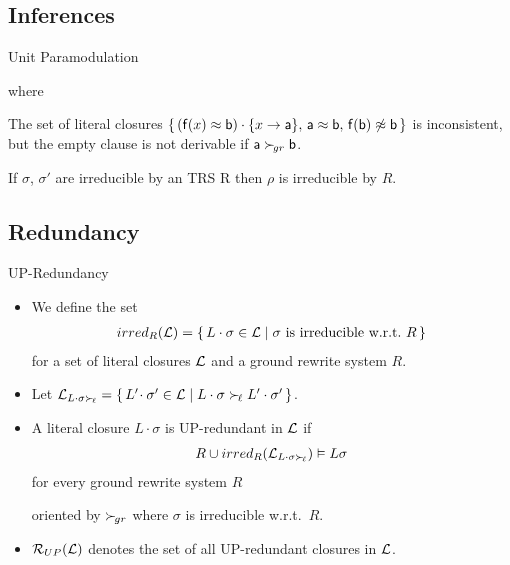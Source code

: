 \documentclass[%
handout,
]{beamer}
\begin{document}
\subsection{Inferences}
\begin{frame}{Unit Paramodulation}


    
    where
    

    \vspace{0.7em}

        \begin{example}
    The set of literal closures
    $\{\,
    (\mathsf{f}(x)\approx\mathsf{b})\cdot\{x\to\mathsf{a}\},\,
    \mathsf{a}\approx \mathsf{b},\,
    \mathsf{f}(\mathsf{b})\not\approx\mathsf{b}\,
    \}$ is inconsistent,
    but the empty clause is not derivable
    if $\mathsf{a}\mathrel\succ_{\!gr}\mathsf{b}$.
        \end{example}

        \vspace{0.7em}

    \begin{lemma}
        If $\sigma$, $\sigma'$ are irreducible by an TRS R then $\rho$ is irreducible by $R$.
    \end{lemma}

\end{frame}


\subsection{Redundancy}
\begin{frame}{UP-Redundancy}
    \begin{itemize}
        \item
    We define the set
    \begin{gather*}
        irred_R(\mathcal{L}) =
        \{\,
        L\cdot\sigma\in\mathcal{L} \mid
        \sigma\text{ is irreducible w.r.t.~}R
        \,\}
    \end{gather*}
    for a set of literal closures $\mathcal{L}$
    and a ground rewrite system $R$.

    \vspace{0.7em}
    \item Let
    $
    \mathcal{L}_{L\cdot\sigma\mathrel\succ_{\!\ell}} =
    \{\,
    L'\!\cdot\sigma'\in\mathcal{L} \mid
    L\cdot\sigma\mathrel\succ_{\!\ell} L'\cdot\sigma'
    \,\}
    $.

    \vspace{0.7em}
    \item A literal closure $L\cdot\sigma$ is UP-redundant in $\mathcal{L}$ if
    \begin{gather*}
        R \cup irred_R(\mathcal{L}_{L\cdot\sigma\mathrel\succ_{\!\ell}}) \vDash L\sigma
    \end{gather*}
    for every ground rewrite system $R$

    oriented by $\mathrel\succ_{\!gr}$
    where $\sigma$ is irreducible w.r.t.~$R$.

    \vspace{0.7em}
    \item
    $\mathcal{R}_{UP}(\mathcal{L})$ denotes the set of all UP-redundant closures in $\mathcal{L}$.
\end{itemize}
\end{frame}
\end{document}
